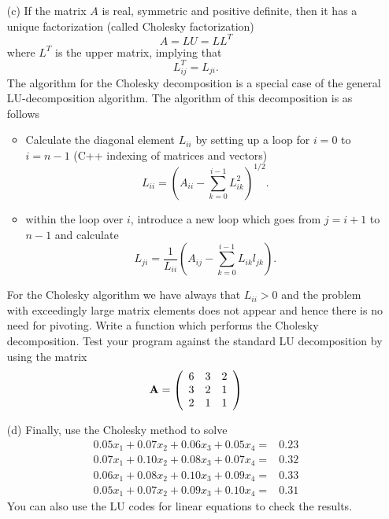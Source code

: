 \begin{enumerate}
\item[(c)] If the matrix $A$ is real, symmetric and positive definite, then
it has  a unique factorization (called Cholesky factorization)
\[
   A = LU = LL^T
\]
where $L^T$ is the upper matrix, implying that
\[
  L^T_{ij} = L_{ji}.
\]
The algorithm for the Cholesky decomposition
is a special case of the general LU-decomposition algorithm.
The algorithm of this decomposition is as follows
\begin{itemize}
\item Calculate the diagonal element $L_{ii}$ by setting up a loop 
for $i=0$ to $i=n-1$ (C++ indexing of matrices and vectors)
\begin{equation}
   L_{ii} = \left(A_{ii} - \sum_{k=0}^{i-1}L_{ik}^2\right)^{1/2}.
\end{equation}
%
\item within the loop over $i$, introduce a new loop which goes 
from $j=i+1$ to $n-1$ and calculate 
%
\begin{equation}
      L_{ji} =
      \frac{1}{L_{ii}}\left(A_{ij}-\sum_{k=0}^{i-1}L_{ik}l_{jk}\right).
\end{equation}
\end{itemize}
For the Cholesky algorithm we have always that $L_{ii} > 0$ and the problem
with exceedingly large matrix elements does not appear and hence there is no
need for pivoting.
Write a function which performs the Cholesky decomposition.
Test your program against the standard LU decomposition by using the matrix
\begin{equation}
 {\bf A} =
      \left( \begin{array}{ccc} 6 & 3 & 2 \\
                                 3 & 2 & 1 \\
                                 2 & 1 & 1 
             \end{array} \right)
\end{equation}
\item[(d)] Finally, use the Cholesky method to solve
\begin{eqnarray}
 0.05x_1 +0.07x_2+0.06x_3 +0.05x_4 =&0.23 \nonumber \\
0.07x_1 +0.10x_2 + 0.08x_3 + 0.07x_4=&0.32 \nonumber \\
0.06x_1 + 0.08x_2 + 0.10x_3 + 0.09x_4=&0.33 \nonumber \\
0.05x_1 + 0.07x_2 + 0.09x_3 + 0.10x_4=&0.31 \nonumber
\end{eqnarray}
You can also use the LU codes for linear equations to check the results. 
\end{enumerate}
























